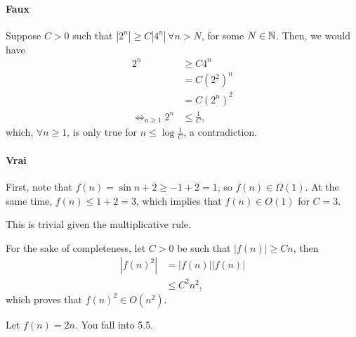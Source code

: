 \paragraph{Faux}

Suppose $C > 0$ such that $|2^{n}| \ge C |4^{n}| \,\forall n > N $, for some $N\in \mathbb{N}$.
Then, we would have
\begin{align*}
    2^{n} &\ge  C 4^{n} \\
    &= C \left( 2^2 \right)^{n}  \\
    &= C (2^n)^2 \\
    \iff_{n\ge 1} 2^{n} &\le \frac{1}{C}
,\end{align*}
which, $\forall n\ge 1$, is only true for $n \le \log \frac{1}{C}$, a contradiction.

\paragraph{Vrai}
First, note that $f(n) = \sin n + 2 \ge -1 + 2 = 1$, so  $f(n) \in \Omega(1)$.
At the same time,  $f(n) \le 1 + 2 = 3$, which implies that $f(n) \in O(1)$ for $C=3$.


This is trivial given the multiplicative rule.

For the sake of completeness, let $C > 0$ be such that $|f(n)| \ge C n$, then
\begin{align*}
    |f(n)^{2}| &= |f(n)| |f(n)| \\
    &\le C^2 n^2 
,\end{align*}
which proves that $f(n)^2 \in O(n^2)$.


Let $f(n) = 2n$.
You fall into 5.5.


